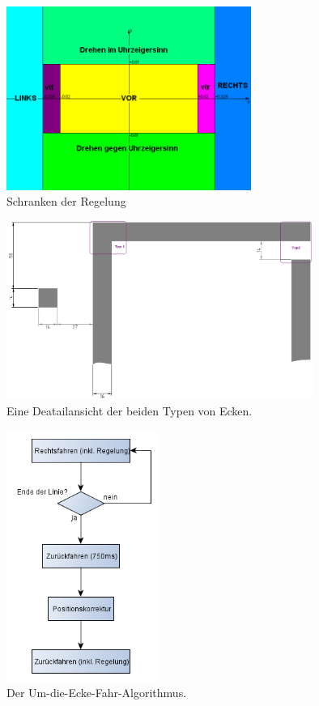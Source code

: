 \documentclass[a4paper,bibtotoc,oneside]{scrbook}
\begin{document}
\begin{figure}[htbp]
\centering
\includegraphics[width=80mm]{img/schranken.png}
\caption{Schranken der Regelung}\label{schr}
\end{figure}

\begin{figure}[htbp]
\centering
\includegraphics[width=100mm]{img/detail.png}
\caption{Eine Deatailansicht der beiden Typen von Ecken.}\label{ecken}
\end{figure}


\begin{figure}[htbp]
\centering
\includegraphics[width=50mm]{img/ecke2.png}
\caption{Der Um-die-Ecke-Fahr-Algorithmus.}\label{eck}
\end{figure}
\end{document}
